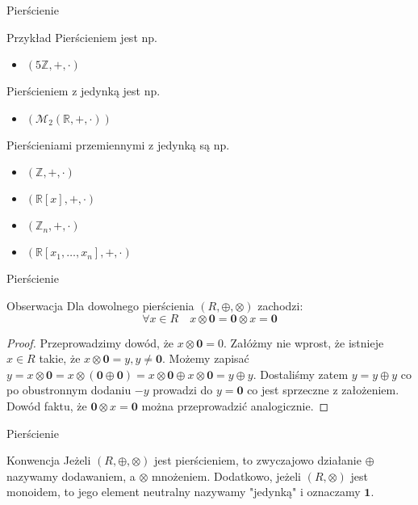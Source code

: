 \documentclass{beamer}
\newcommand{\zero}{\mathbf{0}}
\newcommand{\one}{\mathbf{1}}
\begin{document}
\begin{frame}{Pierścienie}
    \begin{exampleblock}{Przykład}
        Pierścieniem jest np.
        \begin{itemize}
            \item $(5\mathbb{Z}, +, \cdot)$
        \end{itemize}
        Pierścieniem z jedynką jest np.
        \begin{itemize}
            \item $(\mathcal{M}_2(\mathbb{R}, +, \cdot))$
        \end{itemize}
        Pierścieniami przemiennymi z jedynką są np.
        \begin{itemize}
            \item $(\mathbb{Z}, +, \cdot )$
            \item $(\mathbb{R}[x], +, \cdot )$
            \item $(\mathbb{Z}_n, +, \cdot )$
            \item $(\mathbb{R}[x_1,\ldots, x_n], +, \cdot )$
        \end{itemize}
    \end{exampleblock}
\end{frame}

\begin{frame}{Pierścienie}
    \begin{block}{Obserwacja}
        Dla dowolnego pierścienia $(R, \oplus, \otimes)$ zachodzi:
        $$ \forall x \in R \quad x \otimes \zero =  \zero \otimes x = \zero$$
    \end{block}
    \pause 
    \begin{proof}
        Przeprowadzimy dowód, że $x \otimes \zero = 0$.
        Załóżmy nie wprost, że istnieje $x \in R$ takie, że $x \otimes \zero = y, y\neq \zero$.
        Możemy zapisać $y = x \otimes \zero = x \otimes (\zero \oplus \zero) = x \otimes \zero \oplus x \otimes \zero = y \oplus y$.
        Dostaliśmy zatem $y = y \oplus y$ co po obustronnym dodaniu $-y$ prowadzi do $y = \zero$ co jest sprzeczne z założeniem.
        Dowód faktu, że $\zero \otimes x = \zero$ można przeprowadzić analogicznie.
    \end{proof}
\end{frame}

\begin{frame}{Pierścienie}
    \begin{alertblock}{Konwencja}
        Jeżeli $(R, \oplus, \otimes)$ jest pierścieniem, to zwyczajowo działanie $\oplus$ nazywamy dodawaniem, a $\otimes$ mnożeniem.
        Dodatkowo, jeżeli $(R, \otimes)$ jest monoidem, to jego element neutralny nazywamy "jedynką" i oznaczamy $\one$. 
    \end{alertblock}
\end{frame}
\end{document}
